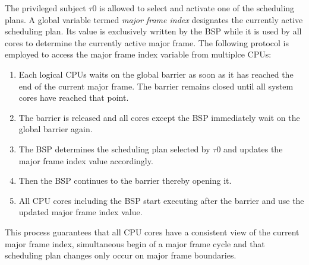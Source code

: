 The privileged subject $\tau$0 is allowed to select and activate one of the
scheduling plans. A global variable termed \emph{major frame index} designates
the currently active scheduling plan. Its value is exclusively written by the
BSP while it is used by all cores to determine the currently active major frame.
The following protocol is employed to access the major frame index variable from
multiplce CPUs:

\begin{enumerate}
	\item Each logical CPUs waits on the global barrier as soon as it has
		reached the end of the current major frame. The barrier remains closed
		until all system cores have reached that point.
	\item The barrier is released and all cores except the BSP immediately wait
		on the global barrier again.
	\item The BSP determines the scheduling plan selected by $\tau$0 and updates
		the major frame index value accordingly.
	\item Then the BSP continues to the barrier thereby opening it.
	\item All CPU cores including the BSP start executing after the barrier and
		use the updated major frame index value.
\end{enumerate}

This process guarantees that all CPU cores have a consistent view of the current
major frame index, simultaneous begin of a major frame cycle and that scheduling
plan changes only occur on major frame boundaries.



